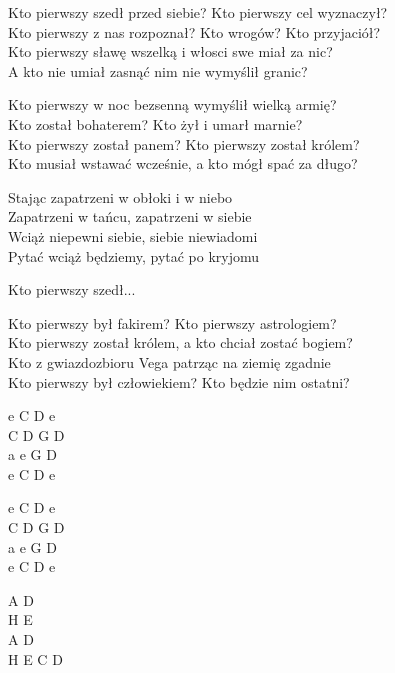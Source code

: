 \begin{text}
    Kto pierwszy szedł przed siebie? Kto pierwszy cel wyznaczył?\\
    Kto pierwszy z nas rozpoznał? Kto wrogów? Kto przyjaciół?\\
    Kto pierwszy sławę wszelką i włosci swe miał za nic?\\
    A kto nie umiał zasnąć nim nie wymyślił granic?

    Kto pierwszy w noc bezsenną wymyślił wielką armię?\\
    Kto został bohaterem? Kto żył i umarł marnie?\\
    Kto pierwszy został panem? Kto pierwszy został królem?\\
    Kto musiał wstawać wcześnie, a kto mógł spać za długo?

    Stając zapatrzeni w obłoki i w niebo\\
    Zapatrzeni w tańcu, zapatrzeni w siebie\\
    Wciąż niepewni siebie, siebie niewiadomi\\
    Pytać wciąż będziemy, pytać po kryjomu

    Kto pierwszy szedł...

    Kto pierwszy był fakirem? Kto pierwszy astrologiem?\\
    Kto pierwszy został królem, a kto chciał zostać bogiem?\\
    Kto z gwiazdozbioru Vega patrząc na ziemię zgadnie\\
    Kto pierwszy był człowiekiem? Kto będzie nim ostatni?
\end{text}
\begin{chord}
    e C D e\\
    C D G D\\
    a e G D\\
    e C D e

    e C D e\\
    C D G D\\
    a e G D\\
    e C D e

    A D\\
    H E\\
    A D\\
    H E C D
\end{chord}